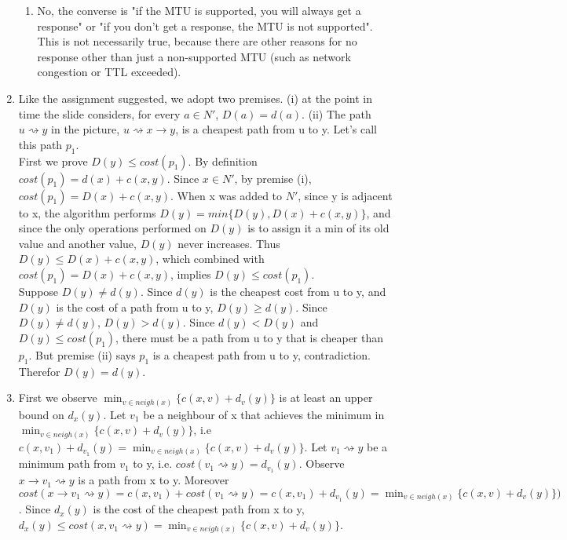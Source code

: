 \documentclass[12pt]{article}
\begin{document}
\begin{enumerate}
\begin{enumerate}
		\item No, the converse is "if the MTU is supported, you will always get a response" or "if you don't get a response, the MTU is not supported". This is not necessarily true, because there are other reasons for no response other than just a non-supported MTU (such as network congestion or TTL exceeded).
	\end{enumerate}
	\item %
        Like the assignment suggested, we adopt two premises. 
        (i) at the point in time the slide considers, for every $a \in N'$, $D(a) = d(a)$. 
        (ii) The path $u \rightsquigarrow y$ in the picture, $u \rightsquigarrow x \rightarrow y$,
        is a cheapest path from u to y. Let's call this path $p_1$.\\


        First we prove $D(y) \leq cost(p_1)$. By definition $cost(p_1) = d(x) + c(x,y)$. Since $x \in N'$, 
        by premise (i), $cost(p_1) = D(x) + c(x,y)$. When x was added to $N'$, since y is adjacent to x,
        the algorithm performs $D(y) = min\{D(y), D(x)+c(x,y)\}$, and since the only operations performed on $D(y)$ is to assign
        it a min of its old value and another value, $D(y)$ never increases. Thus $D(y) \leq D(x) + c(x,y)$,
        which combined with $cost(p_1) = D(x) + c(x,y)$, implies $D(y) \leq cost(p_1)$. \\

        Suppose $D(y) \neq d(y)$. Since $d(y)$ is the cheapest cost from u to y, and $D(y)$ is the 
        cost of a path from u to y, $D(y) \geq d(y)$. Since $D(y) \neq d(y)$, $D(y) > d(y)$. 
        Since $d(y) < D(y)$ and $D(y) \leq cost(p_1)$, there must be a path from u to y that is cheaper 
        than $p_1$. But premise (ii) says $p_1$ is a cheapest path from u to y, contradiction. Therefor $D(y) = d(y)$.
        

	\item %
        
        First we observe $\min_{v \in neigh(x)}\{c(x,v) + d_v(y)\}$
        is at least an upper bound on $d_x(y)$. Let $v_1$ be a neighbour of x that achieves the minimum in
        $\min_{v \in neigh(x)}\{c(x,v) + d_v(y)\}$, i.e $c(x,v_1)+d_{v_1}(y) = \min_{v \in neigh(x)}\{c(x,v) + d_v(y)\}$.  
        Let $v_1 \rightsquigarrow y$ be a minimum path from $v_1$
        to y, i.e. $cost(v_1 \rightsquigarrow y) = d_{v_1}(y)$. Observe $x \rightarrow v_1 \rightsquigarrow y$ is a path from x to y. Moreover
        $cost(x \rightarrow v_1 \rightsquigarrow y) = c(x, v_1) + cost(v_1 \rightsquigarrow y) = c(x, v_1) + d_{v_1}(y) =
        \min_{v \in neigh(x)}\{c(x,v) + d_v(y)\})$.
        Since $d_x(y)$ is the cost of the cheapest path from x to y, 
        $d_x(y) \leq cost(x,v_1 \rightsquigarrow y) = \min_{v \in neigh(x)}\{c(x,v) + d_v(y)\}$. \\


\end{enumerate}
\end{document}
